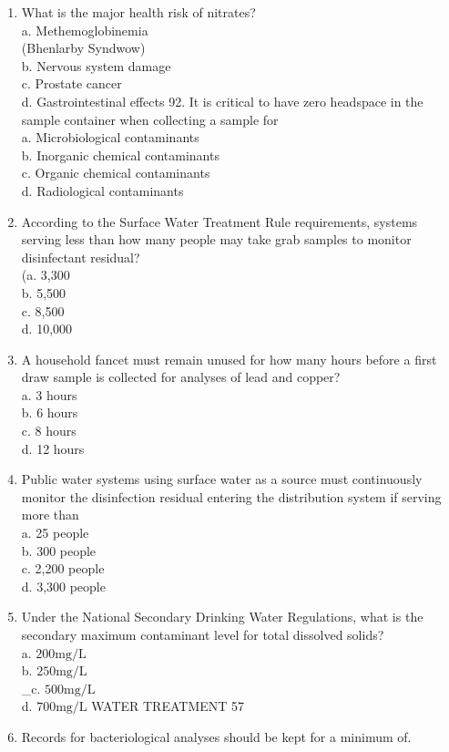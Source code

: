 \documentclass[10pt]{article}
\begin{document}
\begin{enumerate}
  \item What is the major health risk of nitrates?\\
a. Methemoglobinemia\\
(Bhenlarby Syndwow)\\
b. Nervous system damage\\
c. Prostate cancer\\
d. Gastrointestinal effects 92. It is critical to have zero headspace in the sample container when collecting a sample for\\
a. Microbiological contaminants\\
b. Inorganic chemical contaminants\\
c. Organic chemical contaminants\\
d. Radiological contaminants

  \item According to the Surface Water Treatment Rule requirements, systems serving less than how many people may take grab samples to monitor disinfectant residual?\\
(a. 3,300\\
b. 5,500\\
c. 8,500\\
d. 10,000

  \item A household fancet must remain unused for how many hours before a first draw sample is collected for analyses of lead and copper?\\
a. 3 hours\\
b. 6 hours\\
c. 8 hours\\
d. 12 hours

  \item Public water systems using surface water as a source must continuously monitor the disinfection residual entering the distribution system if serving more than\\
a. 25 people\\
b. 300 people\\
c. 2,200 people\\
d. 3,300 people

  \item Under the National Secondary Drinking Water Regulations, what is the secondary maximum contaminant level for total dissolved solids?\\
a. $200 \mathrm{mg} / \mathrm{L}$\\
b. $250 \mathrm{mg} / \mathrm{L}$\\
\_c. $500 \mathrm{mg} / \mathrm{L}$\\
d. $700 \mathrm{mg} / \mathrm{L}$ WATER TREATMENT 57

  \item Records for bacteriological analyses should be kept for a minimum of.

\end{enumerate}
\end{document}
